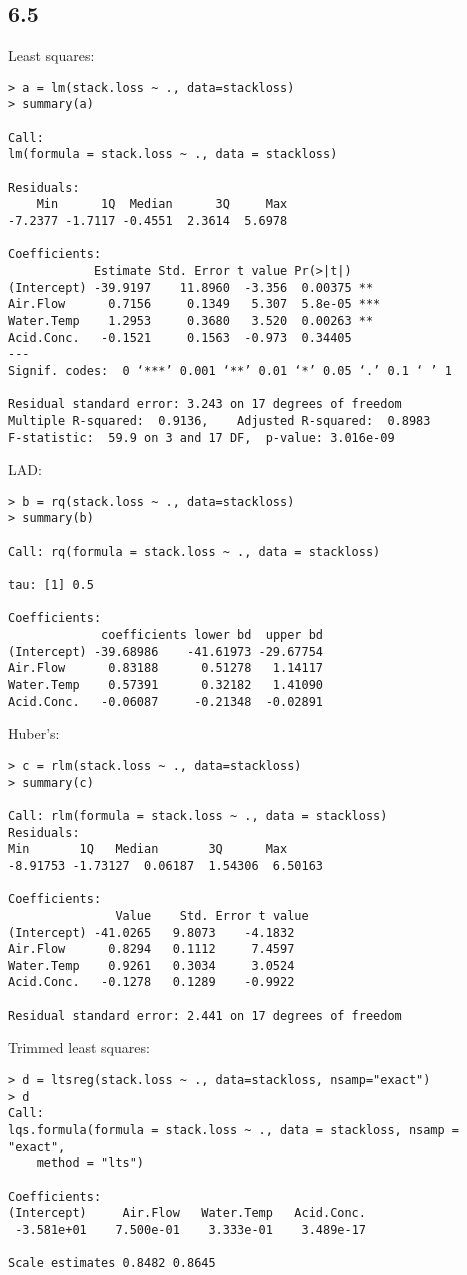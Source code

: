 \documentclass{article}
\begin{document}
\subsection*{6.5}
Least squares:
\begin{verbatim}
> a = lm(stack.loss ~ ., data=stackloss)
> summary(a)

Call:
lm(formula = stack.loss ~ ., data = stackloss)

Residuals:
    Min      1Q  Median      3Q     Max 
-7.2377 -1.7117 -0.4551  2.3614  5.6978 

Coefficients:
            Estimate Std. Error t value Pr(>|t|)    
(Intercept) -39.9197    11.8960  -3.356  0.00375 ** 
Air.Flow      0.7156     0.1349   5.307  5.8e-05 ***
Water.Temp    1.2953     0.3680   3.520  0.00263 ** 
Acid.Conc.   -0.1521     0.1563  -0.973  0.34405    
---
Signif. codes:  0 ‘***’ 0.001 ‘**’ 0.01 ‘*’ 0.05 ‘.’ 0.1 ‘ ’ 1

Residual standard error: 3.243 on 17 degrees of freedom
Multiple R-squared:  0.9136,    Adjusted R-squared:  0.8983 
F-statistic:  59.9 on 3 and 17 DF,  p-value: 3.016e-09
\end{verbatim}
LAD:
\begin{verbatim}
> b = rq(stack.loss ~ ., data=stackloss)
> summary(b)

Call: rq(formula = stack.loss ~ ., data = stackloss)

tau: [1] 0.5

Coefficients:
             coefficients lower bd  upper bd 
(Intercept) -39.68986    -41.61973 -29.67754
Air.Flow      0.83188      0.51278   1.14117
Water.Temp    0.57391      0.32182   1.41090
Acid.Conc.   -0.06087     -0.21348  -0.02891
\end{verbatim}
Huber's:
\begin{verbatim}
> c = rlm(stack.loss ~ ., data=stackloss)
> summary(c)

Call: rlm(formula = stack.loss ~ ., data = stackloss)
Residuals:
Min       1Q   Median       3Q      Max 
-8.91753 -1.73127  0.06187  1.54306  6.50163 

Coefficients:
               Value    Std. Error t value 
(Intercept) -41.0265   9.8073    -4.1832
Air.Flow      0.8294   0.1112     7.4597
Water.Temp    0.9261   0.3034     3.0524
Acid.Conc.   -0.1278   0.1289    -0.9922

Residual standard error: 2.441 on 17 degrees of freedom
\end{verbatim}
Trimmed least squares:
\begin{verbatim}
> d = ltsreg(stack.loss ~ ., data=stackloss, nsamp="exact")
> d
Call:
lqs.formula(formula = stack.loss ~ ., data = stackloss, nsamp = "exact", 
    method = "lts")

Coefficients:
(Intercept)     Air.Flow   Water.Temp   Acid.Conc.  
 -3.581e+01    7.500e-01    3.333e-01    3.489e-17  

Scale estimates 0.8482 0.8645 
\end{verbatim}
\end{document}
